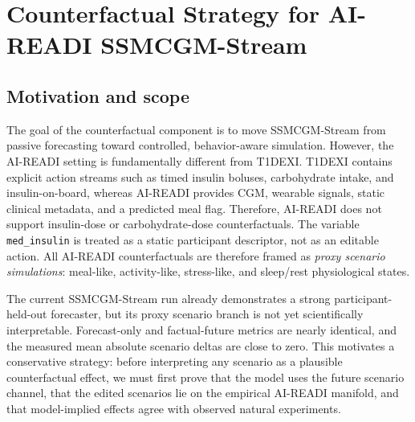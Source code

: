 
\section{Counterfactual Strategy for AI-READI SSMCGM-Stream}
\label{sec:aireadi_counterfactual_strategy}

\subsection{Motivation and scope}
\label{subsec:cf_motivation_scope}

The goal of the counterfactual component is to move SSMCGM-Stream from passive forecasting toward controlled, behavior-aware simulation. However, the AI-READI setting is fundamentally different from T1DEXI. T1DEXI contains explicit action streams such as timed insulin boluses, carbohydrate intake, and insulin-on-board, whereas AI-READI provides CGM, wearable signals, static clinical metadata, and a predicted meal flag. Therefore, AI-READI does not support insulin-dose or carbohydrate-dose counterfactuals. The variable \texttt{med\_insulin} is treated as a static participant descriptor, not as an editable action. All AI-READI counterfactuals are therefore framed as \emph{proxy scenario simulations}: meal-like, activity-like, stress-like, and sleep/rest physiological states.

The current SSMCGM-Stream run already demonstrates a strong participant-held-out forecaster, but its proxy scenario branch is not yet scientifically interpretable. Forecast-only and factual-future metrics are nearly identical, and the measured mean absolute scenario deltas are close to zero. This motivates a conservative strategy: before interpreting any scenario as a plausible counterfactual effect, we must first prove that the model uses the future scenario channel, that the edited scenarios lie on the empirical AI-READI manifold, and that model-implied effects agree with observed natural experiments.

